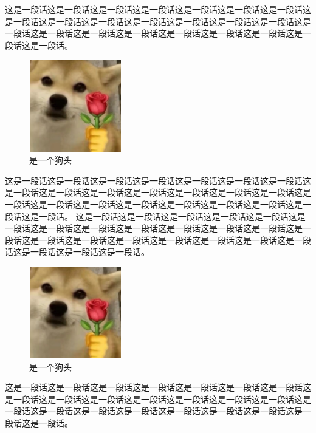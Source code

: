 \documentclass[normalsize]{article}   %
\begin{document}
		\newpage
			这是一段话这是一段话这是一段话这是一段话这是一段话这是一段话这是一段话这是一段话这是一段话这是一段话这是一段话这是一段话这是一段话这是一段话这是一段话这是一段话这是一段话这是一段话这是一段话这是一段话这是一段话这是一段话这是一段话。
			\begin{figure}[b]
			\centering
			\includegraphics[height=4cm,width=4cm]{./img/sample.png}
			\caption{是一个狗头}
			\label{fig:10}
		\end{figure}
	这是一段话这是一段话这是一段话这是一段话这是一段话这是一段话这是一段话这是一段话这是一段话这是一段话这是一段话这是一段话这是一段话这是一段话这是一段话这是一段话这是一段话这是一段话这是一段话这是一段话这是一段话这是一段话这是一段话。
		\newpage
			这是一段话这是一段话这是一段话这是一段话这是一段话这是一段话这是一段话这是一段话这是一段话这是一段话这是一段话这是一段话这是一段话这是一段话这是一段话这是一段话这是一段话这是一段话这是一段话这是一段话这是一段话这是一段话这是一段话。
			\begin{figure}[p]
			\centering
			\includegraphics[height=4cm,width=4cm]{./img/sample.png}%
			\caption{是一个狗头}
			\label{fig:10}
		\end{figure}
		这是一段话这是一段话这是一段话这是一段话这是一段话这是一段话这是一段话这是一段话这是一段话这是一段话这是一段话这是一段话这是一段话这是一段话这是一段话这是一段话这是一段话这是一段话这是一段话这是一段话这是一段话这是一段话这是一段话。
		
\end{document}
